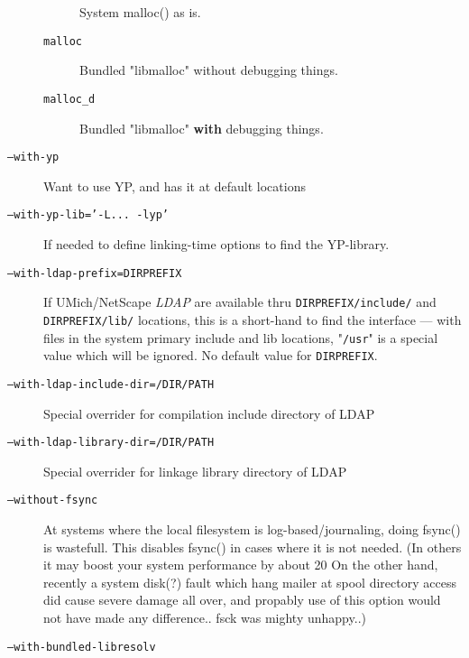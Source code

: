 \begin{description}
\begin{description}
System malloc() as is.

\item[\tt malloc] \mbox{}

Bundled "libmalloc" without debugging things.

\item[\tt malloc\_d] \mbox{}

Bundled "libmalloc" {\bf with} debugging things.
\end{description}

\item[\tt ---with-yp] \mbox{}

Want to use YP, and has it at default locations

\item[\tt ---with-yp-lib='-L... -lyp'] \mbox{}

If needed to define linking-time options to find the YP-library.

\item[\tt ---with-ldap-prefix=DIRPREFIX] \mbox{}

If UMich/NetScape {\em LDAP} are available thru {\tt DIRPREFIX/include/}
and {\tt DIRPREFIX/lib/} locations, this is a short-hand to find
the interface --- with files in the system primary include
and lib locations,  "{\tt /usr}" is a special value which will be
ignored.  No default value for {\tt DIRPREFIX}.

\item[\tt ---with-ldap-include-dir=/DIR/PATH] \mbox{}

Special overrider for compilation include directory of LDAP

\item[\tt ---with-ldap-library-dir=/DIR/PATH] \mbox{}

Special overrider for linkage library directory of LDAP

\item[\tt ---without-fsync] \mbox{}

At systems where the local filesystem is log-based/journaling,
doing   fsync()  is wastefull.  This disables fsync() in
cases where it is not needed.    (In others it may boost
your system performance by about 20%
On the other hand, recently a system disk(?) fault which
hang mailer at spool directory access did cause severe
damage all over, and propably use of this option would
not have made any difference..  fsck was mighty unhappy..)

\item[\tt ---with-bundled-libresolv] \mbox{}


\end{description}
